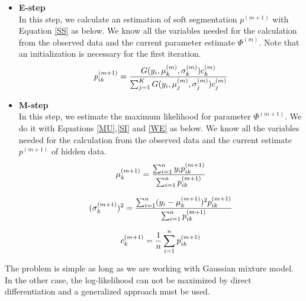\begin{itemize}

\item \textbf{E-step}\\
In this step, we calculate an estimation of soft segmentation $p^{(m+1)}$ with Equation \ref{SS} as below. We know all the variables needed for the calculation from the observed data and the current parameter estimate $\Phi^{(m)}$. Note that an initialization is necessary for the first iteration.\\

  \begin{equation*}
  p_{ik}^{(m+1)}= \frac{G(y_i,\mu_k^{(m)},\sigma_k^{(m)})c_k^{(m)}}{\sum_{j=1}^K G(y_i,\mu_j^{(m)},\sigma_j^{(m)})c_j^{(m)}}\\
  \end{equation*}

\item \textbf{M-step}\\
In this step, we estimate the maximum likelihood for parameter $\Phi^{(m+1)}$. We do it with Equations \ref{MU},\ref{SI} and \ref{WE} as below. We know all the variables needed for the calculation from the observed data and the current estimate $p^{(m+1)}$ of hidden data.\\

  \begin{equation*}
  \mu_k^{(m+1)} = \frac{\sum_{i=1}^n y_ip_{ik}^{(m+1)}}{\sum_{i=1}^n p_{ik}^{(m+1)}}\\
  \end{equation*}

  \begin{equation*}
  (\sigma_k^{(m+1)})^2 = \frac{\sum_{i=1}^n (y_i-\mu_k^{(m+1)})^2p_{ik}^{(m+1)}}{\sum_{i=1}^n p_{ik}^{(m+1)}}\\
  \end{equation*}
  
  \begin{equation*}
  c_k^{(m+1)} = \frac{1}{n}\sum_{i=1}^n p_{ik}^{(m+1)}\\
  \end{equation*}
\end{itemize}

The problem is simple as long as we are working with Gaussian mixture model. In the other case, the log-likelihood can not be maximized by direct differentiation and a generalized approach must be used.
%
